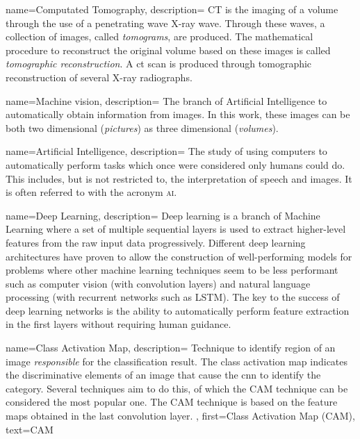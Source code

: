 {
        name={Computated Tomography},
        description={
                CT is the imaging of a volume through the use of a penetrating wave X-ray wave. 
                Through these waves, a collection of images, called \textit{tomograms}, are produced.
                The mathematical procedure to reconstruct the original volume based on these images is called \textit{tomographic reconstruction}.
                A \acrfull{ct} scan is produced through tomographic reconstruction of several X-ray radiographs.
                }
}

{
        name={Machine vision},
        description={
                The branch of Artificial Intelligence to automatically obtain information from images. 
                In this work, these images can be both two dimensional (\textit{pictures}) as three dimensional (\textit{volumes}).
                }
}

{
        name={Artificial Intelligence},
        description={
                The study of using computers to automatically perform tasks which once were considered only humans could do.
                This includes, but is not restricted to, the interpretation of speech and images. It is often referred to with the acronym \textsc{ai}.
                }
}

{
        name={Deep Learning},
        description={
                Deep learning is a branch of Machine Learning where a set of multiple sequential layers is used to extract higher-level features from the raw input data progressively.
                Different deep learning architectures have proven to allow the construction of well-performing models for problems where other machine learning techniques seem to be less performant such as
                computer vision (with convolution layers) and natural language processing (with recurrent networks such as LSTM). 
                The key to the success of deep learning networks is the ability to automatically perform feature extraction in the first layers without requiring human guidance.
                }
}

{
        name={Class Activation Map},
        description={
                Technique to identify region of an image \textit{responsible} for the classification result.
                The class activation map indicates the discriminative elements of an image that cause the \acrshort{cnn} to identify the category.
                Several techniques aim to do this, of which the CAM technique can be considered the most popular one.
                The CAM technique is based on the feature maps obtained in the last convolution layer.
        },
        first={Class Activation Map (CAM)},
        text={CAM}
}



